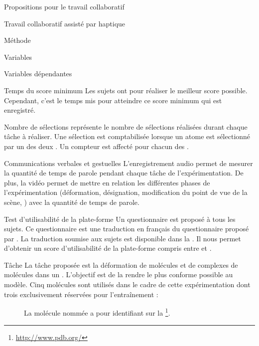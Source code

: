 \documentclass[myfrancais]{mythesis}
\begin{document}
\begin{mypart}{Propositions pour le travail collaboratif}
\begin{mychapter}{Travail collaboratif assisté par haptique}
\begin{mysection}{Méthode}
\begin{mysubsection}{Variables}
\begin{mysubsubsection}{Variables dépendantes}
\begin{myparagraph}{ Temps du score  minimum}
							Les sujets ont  pour réaliser le meilleur score  possible.
							Cependant, c'est le temps mis pour atteindre ce score minimum qui est enregistré.
						\end{myparagraph}
						\begin{myparagraph}{ Nombre de sélections}
							 représente le nombre de sélections réalisées durant chaque tâche à réaliser.
							Une sélection est comptabilisée lorsque un atome est sélectionné par un des deux .
							Un compteur est affecté pour chacun des .
						\end{myparagraph}
						\begin{myparagraph}{ Communications verbales et gestuelles}
							L'enregistrement audio permet de mesurer la quantité de temps de parole pendant chaque tâche de l'expérimentation.
							De plus, la vidéo permet de mettre en relation les différentes phases de l'expérimentation (déformation, désignation, modification du point de vue de la scène, \myetc) avec la quantité de temps de parole.
						\end{myparagraph}
						\begin{myparagraph}{ Test d'utilisabilité de la plate-forme}
							Un questionnaire est proposé à tous les sujets.
							Ce questionnaire est une traduction en français du questionnaire  proposé par .
							La traduction soumise aux sujets est disponible dans la .
							Il nous permet d'obtenir un score d'utilisabilité de la plate-forme compris entre  et .
						\end{myparagraph}
					\end{mysubsubsection}
				\end{mysubsection}
				\begin{mysubsection}[sse-exp4-Tache]{Tâche}
					La tâche proposée est la déformation de molécules et de complexes de molécules dans un .
					L'objectif est de la rendre le plus conforme possible au modèle.
					Cinq molécules sont utilisés dans le cadre de cette expérimentation dont trois exclusivement réservées pour l'entraînement :
					\begin{description}
						\item[\myTRPCAGE]
							La molécule nommée \myTRPCAGE {} a pour identifiant \myPDB {} sur la \myPDBbase\footnote{\url{http://www.pdb.org/}}.

\end{description}
\end{mysubsection}
\end{mysection}
\end{mychapter}
\end{mypart}
\end{document}
